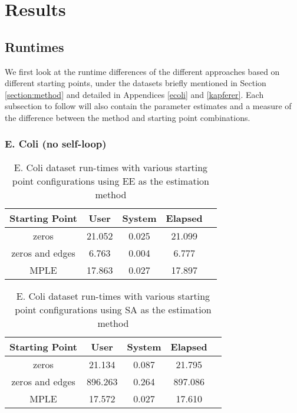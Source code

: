 \section{Results}
\label{section:results}

\subsection{Runtimes}

We first look at the runtime differences of the different approaches based on different starting points, under the datasets briefly mentioned in Section \ref{section:method} and detailed in Appendices \ref{ecoli} and \ref{kapferer}. Each subsection to follow will also contain the parameter estimates and a measure of the difference between the method and starting point combinations.

\subsubsection{E. Coli (no self-loop)}


\begin{table}[!ht]
 \centering
 \begin{tabular}{||c | c | c | c | c||} 
 \hline
 Starting Point & User & System & Elapsed \\
 \hline\hline
 zeros & 21.052 & 0.025 & 21.099 \\ 
 \hline
 zeros and edges & 6.763 & 0.004 & 6.777 \\
 \hline
 MPLE & 17.863 & 0.027 & 17.897 \\
 \hline
 \end{tabular}
 \label{t:ecoli1_ee}
 \caption{E. Coli dataset run-times with various starting point configurations using EE as the estimation method}
\end{table}

\begin{table}[!ht]
\centering
\begin{tabular}{||c | c | c | c | c||}
 \hline
 Starting Point & User & System & Elapsed \\ 
 \hline
 zeros & 21.134 & 0.087 & 21.795 \\
 \hline
 zeros and edges & 896.263 & 0.264 & 897.086 \\ 
 \hline
 MPLE & 17.572 & 0.027 & 17.610 \\
 \hline
 \end{tabular}
 \label{t:ecoli1_sa}
 \caption{E. Coli dataset run-times with various starting point configurations using SA as the estimation method}
 \end{table}

